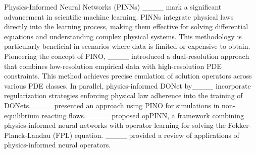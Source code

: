 Physics-Informed Neural Networks (PINNs) ____ 
 mark a significant advancement in scientific machine learning. PINNs integrate physical laws directly into the learning process, making them effective for solving differential equations and understanding complex physical systems. This methodology is particularly beneficial in scenarios where data is limited or expensive to obtain.
 Pioneering the concept of PINO, ____ introduced a dual-resolution approach that combines low-resolution empirical data with high-resolution PDE constraints. This method achieves precise emulation of solution operators across various PDE classes. In parallel, physics-informed DONet by____ incorporate regularization strategies enforcing physical law adherence into the training of DONets.____ presented an approach using PINO for simulations in non-equilibrium reacting flows.  ____ proposed opPINN, a framework combining physics-informed neural networks with operator learning for solving the Fokker-Planck-Landau (FPL) equation. ____ provided a review of applications of physics-informed neural operators. %
